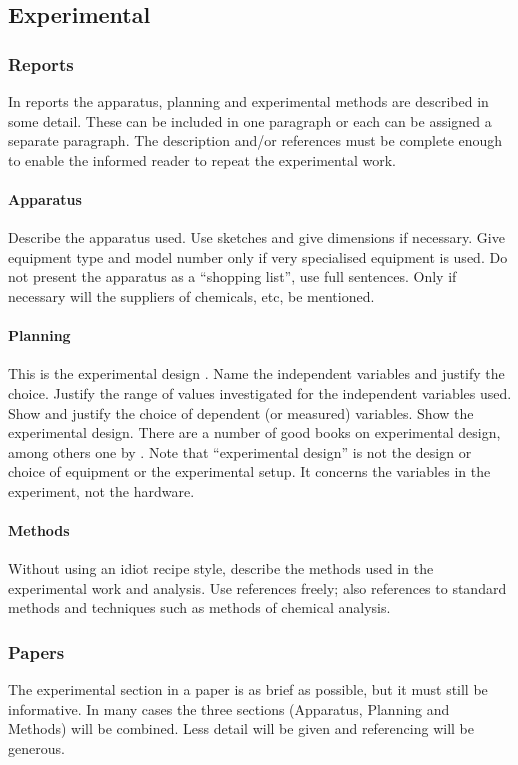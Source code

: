 \documentclass[a5paper, 10pt]{article}
\begin{document}
\subsection{Experimental}
\label{sec:experimental}
\subsubsection{Reports}

In reports the apparatus, planning and experimental methods are
described in some detail.  These can be included in one paragraph or
each can be assigned a separate paragraph.  The description and/or
references must be complete enough to enable the informed reader to
repeat the experimental work.

\paragraph{Apparatus} 
Describe the apparatus used.  Use sketches and give dimensions if
necessary.  Give equipment type and model number only if very specialised
equipment is used.  Do not present the apparatus as a ``shopping
list'', use full sentences. Only if necessary will the suppliers of chemicals, etc, be mentioned.

\paragraph{Planning}
This is the experimental design .
Name the independent variables and justify the choice.  Justify the
range of values investigated for the independent variables used.  Show
and justify the choice of dependent (or measured) variables.  Show the
experimental design.  There are a number of good books on experimental
design, among others one by \citet{hicks}.  Note that
``experimental design'' is not the design or choice of equipment or
the experimental setup.  It concerns the variables in the experiment,
not the hardware.

\paragraph{Methods}
Without using an idiot recipe style, describe the methods used in the
experimental work and analysis.  Use references freely; also
references to standard methods and techniques such as methods of
chemical analysis.

\subsubsection{Papers}
The experimental section in a paper is as brief as possible, but it
must still be informative.  In many cases the three sections
(Apparatus, Planning and Methods) will be combined.  
Less detail will be given and referencing will be generous.
\end{document}
